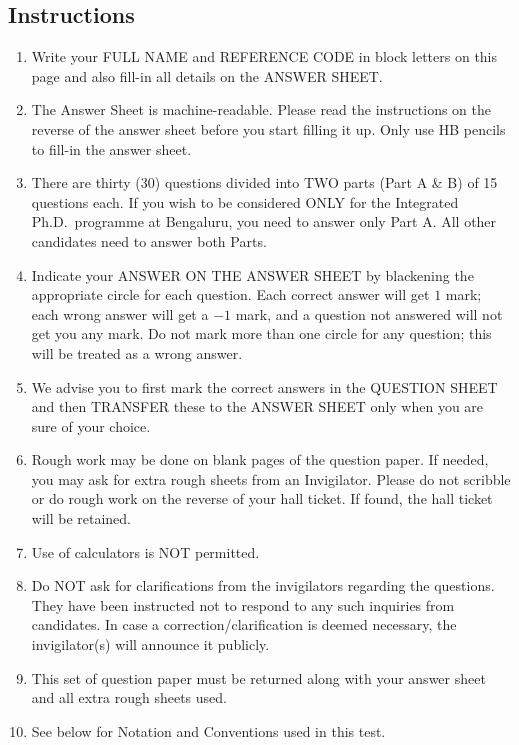 \documentclass[11pt, a4paper]{article}
\begin{document}
\subsection*{Instructions}
\begin{enumerate}
  \item Write your FULL NAME and REFERENCE CODE in block letters on this page and also fill-in all details on the ANSWER SHEET.
  \item The Answer Sheet is machine-readable. Please read the instructions on the reverse of the answer sheet before you start filling it up. Only use HB pencils to fill-in the answer sheet.
  \item There are thirty (30) questions divided into TWO parts (Part A \& B) of 15 questions each. If you wish to be considered ONLY for the Integrated Ph.D.\ programme at Bengaluru, you need to answer only Part A. All other candidates need to answer both Parts.
  \item Indicate your ANSWER ON THE ANSWER SHEET by blackening the appropriate circle for each question. Each correct answer will get $1$ mark; each wrong answer will get a $-1$ mark, and a question not answered will not get you any mark. Do not mark more than one circle for any question; this will be treated as a wrong answer.
  \item We advise you to first mark the correct answers in the QUESTION SHEET and then TRANSFER these to the ANSWER SHEET only when you are sure of your choice.
  \item Rough work may be done on blank pages of the question paper. If needed, you may ask for extra rough sheets from an Invigilator. Please do not scribble or do rough work on the reverse of your hall ticket. If found, the hall ticket will be retained.
  \item Use of calculators is NOT permitted.
  \item Do NOT ask for clarifications from the invigilators regarding the questions. They have been instructed not to respond to any such inquiries from candidates. In case a correction/clarification is deemed necessary, the invigilator(s) will announce it publicly.
  \item This set of question paper must be returned along with your answer sheet and all extra rough sheets used.
  \item See below for Notation and Conventions used in this test.
\end{enumerate}
\end{document}

